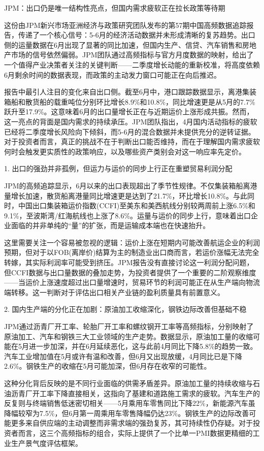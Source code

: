 \documentclass[11pt]{ctexart}
\begin{document}
JPM：出口仍是唯一结构性亮点，但国内需求疲软正在拉长政策等待期

这份由JPM新兴市场亚洲经济与政策研究团队发布的第57期中国高频数据追踪报告，传递了一个核心信号：5-6月的经济活动数据并未形成清晰的复苏趋势。出口侧的运量数据在6月出现了显著的同比加速，但国内生产、信贷、汽车销售和房地产市场的信号依然偏弱。JPM团队通过高频指标与官方月度数据的映射，给出了一个值得产业决策者关注的关键判断——二季度增长动能的重新校准，将高度依赖6月剩余时间的数据表现，而政策的主动发力窗口可能正在向后推迟。

报告中最引人注目的变化来自出口侧。截至6月中，港口跟踪数据显示，离港集装箱船和散货船的载重吨位分别环比增长8.9\%和10.8\%，同比增速更是从5月的7.7\%跃升至17.9\%。这意味着6月的出口量增长正在与近期运价上涨形成共振。然而，这一亮点的背面是国内需求的持续承压。JPM团队指出，4月国内活动指标的疲软已经将二季度增长风险向下倾斜，而5-6月的混合数据并未提供充分的逆转证据。对于投资者而言，真正的挑战不在于判断出口能否维持，而在于理解国内需求疲软何时会触发更实质性的政策响应，以及哪些资产类别会对这一响应率先定价。

1. 出口的强劲并非孤例，但运力与运价的同步上行正在重塑贸易利润分配

JPM的高频追踪显示，6月以来的出口表现超出了季节性规律。不仅集装箱船离港量增长加速，散货船离港量同比增速更是达到了21.7\%，环比增长10.8\%。与此同时，中国出口集装箱运价指数(CCFI)至美东和美西航线分别较两周前上涨6.5\%和9.1\%，至波斯湾/红海航线也上涨了8.6\%。运量与运价的同步上行，意味着出口企业面临的并非单纯的“量”的扩张，而是运输成本端也在快速抬升。

这里需要关注一个容易被忽视的逻辑：运价上涨在短期内可能改善航运企业的利润预期，但对于以FOB(离岸价)结算为主的制造业出口商而言，若运价涨幅无法完全转嫁，其实际利润率可能受到挤压。JPM报告没有直接讨论这一利润分配问题，但CCFI数据与出口量数据的叠加走势，为投资者提供了一个重要的二阶观察维度——当运价上涨速度超过出口量增速时，贸易环节的利润可能正在从生产端向物流端转移。这一判断对于评估出口相关产业链的盈利质量具有前置意义。

2. 国内生产端的分化正在加剧：原油加工收缩深化，钢铁边际改善但基础不稳

JPM通过沥青厂开工率、轮胎厂开工率和螺纹钢开工率等高频指标，分别映射了原油加工、汽车和钢铁三大工业领域的生产走势。数据显示，原油加工量的收缩可能在5月进一步加深，并在6月延续恶化，这与此前4月同比下降5.8\%的趋势一致。汽车工业增加值在5月或许有温和改善，但6月又出现放缓，4月同比已是下降2.6\%。钢铁生产的收缩在5月可能加深，但6月存在收窄的可能性。

这种分化背后反映的是不同行业面临的供需矛盾差异。原油加工量的持续收缩与石油沥青厂开工率下降直接相关，这指向了基建和道路施工需求的疲软。汽车生产的反复则与终端销售低迷密切相关——5月乘用车零售同比下降22\%，新能源汽车虽降幅较窄为7.5\%，但6月第一周乘用车零售降幅仍达23\%。钢铁生产的边际改善可能更多来自供应端的主动调整而非需求端的强劲复苏，其可持续性仍存疑。对于投资者而言，这三个高频指标的组合，实际上提供了一个比单一PMI数据更精细的工业生产景气度评估框架。
\end{document}
